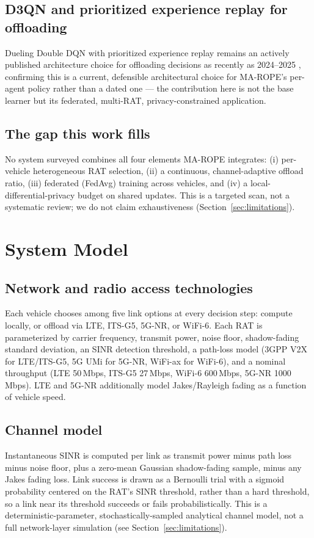 \documentclass[10pt,twocolumn]{article}
\begin{document}
\subsection{D3QN and prioritized experience replay for offloading}
Dueling Double DQN with prioritized experience replay remains an actively published architecture
choice for offloading decisions as recently as 2024--2025 \cite{pd3qn2024}, confirming this is a
current, defensible architectural choice for MA-ROPE's per-agent policy rather than a dated one ---
the contribution here is not the base learner but its federated, multi-RAT, privacy-constrained
application.

\subsection{The gap this work fills}
No system surveyed combines all four elements MA-ROPE integrates: (i) per-vehicle heterogeneous
RAT selection, (ii) a continuous, channel-adaptive offload ratio, (iii) federated (FedAvg) training
across vehicles, and (iv) a local-differential-privacy budget on shared updates. This is a targeted
scan, not a systematic review; we do not claim exhaustiveness (Section~\ref{sec:limitations}).

\section{System Model}
\label{sec:sysmodel}

\subsection{Network and radio access technologies}
Each vehicle chooses among five link options at every decision step: compute locally, or offload
via LTE, ITS-G5, 5G-NR, or WiFi-6. Each RAT is parameterized by carrier frequency, transmit power,
noise floor, shadow-fading standard deviation, an SINR detection threshold, a path-loss model
(3GPP V2X for LTE/ITS-G5, 5G UMi for 5G-NR, WiFi-ax for WiFi-6), and a nominal throughput (LTE
50\,Mbps, ITS-G5 27\,Mbps, WiFi-6 600\,Mbps, 5G-NR 1000\,Mbps). LTE and 5G-NR additionally model
Jakes/Rayleigh fading as a function of vehicle speed.

\subsection{Channel model}
Instantaneous SINR is computed per link as transmit power minus path loss minus noise floor, plus
a zero-mean Gaussian shadow-fading sample, minus any Jakes fading loss. Link success is drawn as a
Bernoulli trial with a sigmoid probability centered on the RAT's SINR threshold, rather than a hard
threshold, so a link near its threshold succeeds or fails probabilistically. This is a
deterministic-parameter, stochastically-sampled analytical channel model, not a full network-layer
simulation (see Section~\ref{sec:limitations}).
\end{document}
